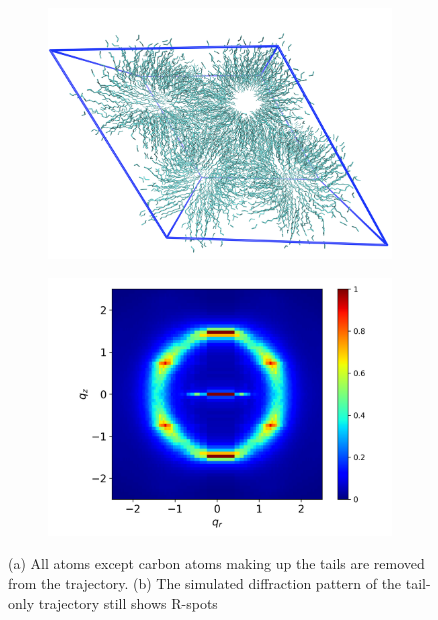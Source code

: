 \documentclass{article}
\begin{document}
  \begin{figure}
	\centering
	\begin{subfigure}{0.45\linewidth}
		\centering
		\includegraphics[width=\textwidth]{tails_topview.png}  %
		\caption{}\label{fig:topdown_tails_only}
	\end{subfigure}
	\begin{subfigure}{0.45\linewidth}
		\centering
		\includegraphics[width=\textwidth]{tails_rzplot.png}
		\caption{}\label{fig:tails_rzplot}
	\end{subfigure}
	\caption{(a) All atoms except carbon atoms making up the tails are removed from the 
	trajectory. (b) The simulated diffraction pattern of the tail-only trajectory still 
        shows R-spots}\label{fig:tails}
  \end{figure}
 
\end{document}
